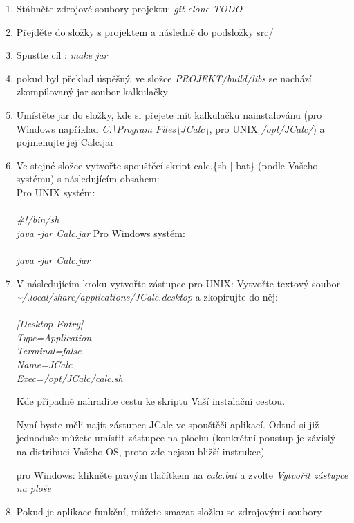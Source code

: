 \documentclass[a4paper, 11pt]{article}
\begin{document}
\begin{enumerate}
	\item Stáhněte zdrojové soubory projektu: \emph{git clone TODO}
	\item Přejděte do složky s projektem a následně do podsložky src/
	\item Spusťte cíl : \emph{make jar}
	\item pokud byl překlad úspěšný, ve složce \emph{PROJEKT/build/libs} se nachází zkompilovaný jar soubor kalkulačky
	\item Umístěte jar do složky, kde si přejete mít kalkulačku nainstalovánu (pro Windows například \emph{C:\textbackslash Program Files\textbackslash JCalc\textbackslash}, pro UNIX \emph{/opt/JCalc/}) a pojmenujte jej Calc.jar
	\item Ve stejné složce vytvořte spouštěcí skript calc.\{sh | bat\} (podle Vašeho systému) s následujícím obsahem:\\
		\subitem Pro UNIX systém:\\\\
			\emph{\#!/bin/sh\\
				java -jar Calc.jar}
		\subitem Pro Windows systém:\\\\
			\emph{java -jar Calc.jar}

	\item V následujícím kroku vytvořte zástupce
		\subitem pro UNIX:
			\subsubitem Vytvořte textový soubor \emph{\textasciitilde/.local/share/applications/JCalc.desktop} a zkopírujte do něj:\\\\
						\emph{
						[Desktop Entry]\\
						Type=Application\\
						Terminal=false\\
						Name=JCalc\\
						Exec=/opt/JCalc/calc.sh\\
						}

			\subsubitem Kde případně nahradíte cestu ke skriptu Vaší instalační cestou.

			\subsubitem Nyní byste měli najít zástupce JCalc ve spouštěči aplikací. Odtud si již jednoduše můžete umístit zástupce na plochu (konkrétní poustup je závislý na distribuci Vašeho OS, proto zde nejsou bližší instrukce)

		\subitem pro Windows:
			\subsubitem klikněte pravým tlačítkem na \emph{calc.bat} a zvolte \emph{Vytvořit zástupce na ploše}


	\item Pokud je aplikace funkční, můžete smazat složku se zdrojovými soubory
\end{enumerate}
\end{document}
